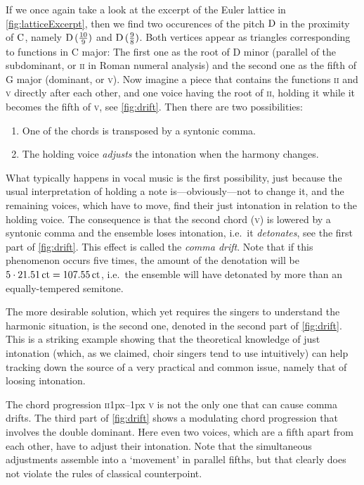 \documentclass[british,11pt]{scrartcl}
\begin{document}
If we once again take a look at the excerpt of the Euler lattice in
\cref{fig:latticeExcerpt}, then we find two occurences of the pitch $\text{D}$ in the
proximity of $\text{C}$, namely \naturalm $\text{D}\,(\frac{10}9)$ and $\text{D}\,(\frac98)$. Both
vertices appear as triangles corresponding to functions in C major: The first
one as the root of D minor (parallel of the subdominant, or \textsc{ii} in Roman
numeral analysis) and the second one as the fifth of G major (dominant, or
\textsc{v}).  Now imagine a piece that contains the functions \textsc{ii} and
\textsc{v} directly after each other, and one voice having the root of
\textsc{ii}, holding it while it becomes the fifth of \textsc{v}, see
\cref{fig:drift}.  Then there are two possibilities:

\begin{enumerate}[itemsep=0em]
\item One of the chords is transposed by a syntonic comma.
\item The holding voice \emph{adjusts} the intonation when the harmony changes.
\end{enumerate}%
%
What typically happens in vocal music is the first possibility, just because the
usual interpretation of holding a note is—obviously—not to change it, and the
remaining voices, which have to move, find their just intonation in relation to
the holding voice.  The consequence is that the second chord (\textsc{v}) is
lowered by a syntonic comma and the ensemble loses intonation, i.e.\ it
\emph{detonates}, see the first part of \cref{fig:drift}.  This effect is called
the \emph{comma drift}.  Note that if this phenomenon occurs five times, the
amount of the denotation will be $5\cdot 21.51\,\mathrm{ct}=107.55\,\mathrm{ct}$, i.e.\
the ensemble will have detonated by more than an equally-tempered semitone.

The more desirable solution, which yet requires the singers to understand the
harmonic situation, is the second one, denoted in the second part of
\cref{fig:drift}.  This is a striking example showing that the theoretical
knowledge of just intonation (which, as we claimed, choir singers tend to use
intuitively) can help tracking down the source of a very practical and common
issue, namely that of loosing intonation.

The chord progression \textsc{ii}\kern1px–\kern1px \textsc{v} is not the only
one that can cause comma drifts. The third part of \cref{fig:drift} shows a
modulating chord progression that involves the double dominant. Here even two
voices, which are a fifth apart from each other, have to adjust their
intonation.  Note that the simultaneous adjustments assemble into a ‘movement’
in parallel fifths, but that clearly does not violate the rules of classical
counterpoint.
\end{document}
